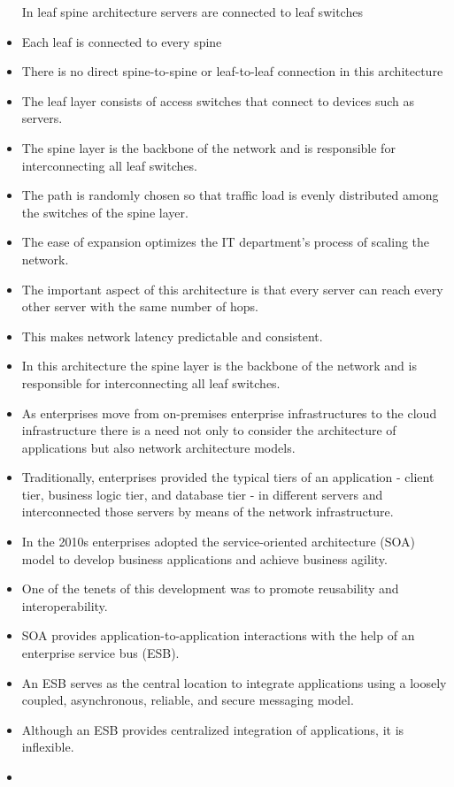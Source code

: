 \documentclass[a4paper, 12pt]{article}
\begin{document}
\begin{itemize}
In leaf spine architecture servers are connected to leaf switches
\item
Each leaf is connected to every spine
\item
There is no direct spine-to-spine or leaf-to-leaf connection in this architecture
\item
The leaf layer consists of access switches that connect to devices such as servers.
\item
The spine layer is the backbone of the network and is responsible for interconnecting all leaf switches.
\item
The path is randomly chosen so that traffic load is evenly distributed among the switches of the spine layer.
\item
The ease of expansion optimizes the IT department's process of scaling the network. 
\item
The important aspect of this architecture is that every server can reach every other server with the same number of hops.
\item
This makes network latency predictable and consistent.
\item
In this architecture the spine layer is the backbone of the network and is responsible for interconnecting all leaf switches.
\item
As enterprises move from on-premises enterprise infrastructures to the cloud infrastructure there is a need not only to consider the architecture of applications but also network architecture models.
\item
Traditionally, enterprises provided the typical tiers of an application - client tier, business logic tier, and database tier - in different servers and interconnected those servers by means of the network infrastructure.
\item
In the 2010s enterprises adopted the service-oriented architecture (SOA) model to develop business applications and achieve business agility.
\item
One of the tenets of this development was to promote reusability and interoperability.
\item
SOA provides application-to-application interactions with the help of an enterprise service bus (ESB).
\item
An ESB serves as the central location to integrate applications using a loosely coupled, asynchronous, reliable, and secure messaging model.
\item
Although an ESB provides centralized integration of applications, it is inflexible.
\item

\end{itemize}
\end{document}

